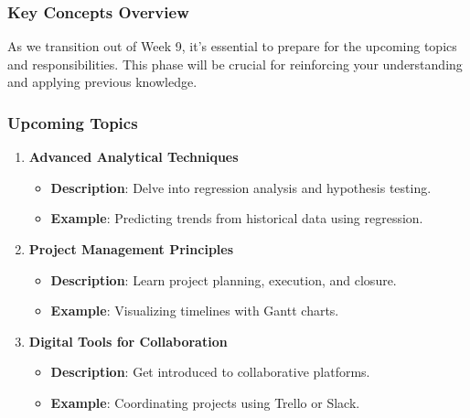 \documentclass[aspectratio=169]{beamer}
\begin{document}
\begin{frame}[fragile]
    \frametitle{Key Concepts Overview}
    As we transition out of Week 9, it's essential to prepare for the upcoming topics and responsibilities. This phase will be crucial for reinforcing your understanding and applying previous knowledge.
\end{frame}

\begin{frame}[fragile]
    \frametitle{Upcoming Topics}
    \begin{enumerate}
        \item \textbf{Advanced Analytical Techniques}
        \begin{itemize}
            \item \textbf{Description}: Delve into regression analysis and hypothesis testing.
            \item \textbf{Example}: Predicting trends from historical data using regression.
        \end{itemize}
        
        \item \textbf{Project Management Principles}
        \begin{itemize}
            \item \textbf{Description}: Learn project planning, execution, and closure.
            \item \textbf{Example}: Visualizing timelines with Gantt charts.
        \end{itemize}
        
        \item \textbf{Digital Tools for Collaboration}
        \begin{itemize}
            \item \textbf{Description}: Get introduced to collaborative platforms.
            \item \textbf{Example}: Coordinating projects using Trello or Slack.
        \end{itemize}
    \end{enumerate}
\end{frame}
\end{document}
